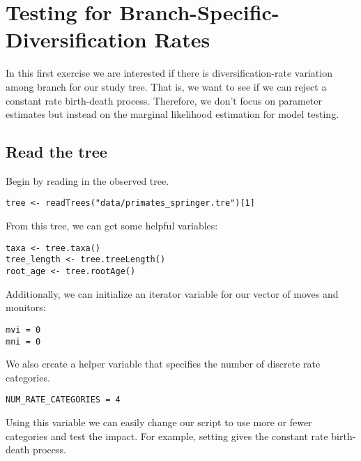 \bigskip
\section{Testing for Branch-Specific-Diversification Rates}

In this first exercise we are interested if there is diversification-rate variation among branch for our study tree.
That is, we want to see if we can reject a constant rate birth-death process.
Therefore, we don't focus on parameter estimates but instead on the marginal likelihood estimation for model testing.



\subsection{Read the tree}

Begin by reading in the observed tree. 

{\tt \begin{snugshade*}
\begin{lstlisting}
tree <- readTrees("data/primates_springer.tre")[1]
\end{lstlisting}
\end{snugshade*}}

From this tree, we can get some helpful variables:
{\tt \begin{snugshade*}
\begin{lstlisting}
taxa <- tree.taxa()
tree_length <- tree.treeLength()
root_age <- tree.rootAge()
\end{lstlisting}
\end{snugshade*}}

Additionally, we can initialize an iterator variable for our vector of moves and monitors:
{\tt \begin{snugshade*}
\begin{lstlisting}
mvi = 0
mni = 0
\end{lstlisting}
\end{snugshade*}}

We also create a helper variable that specifies the number of discrete rate categories.
{\tt \begin{snugshade*}
\begin{lstlisting}
NUM_RATE_CATEGORIES = 4
\end{lstlisting}
\end{snugshade*}}
Using this variable we can easily change our script to use more or fewer categories and test the impact.
For example, setting  gives the constant rate birth-death process.

